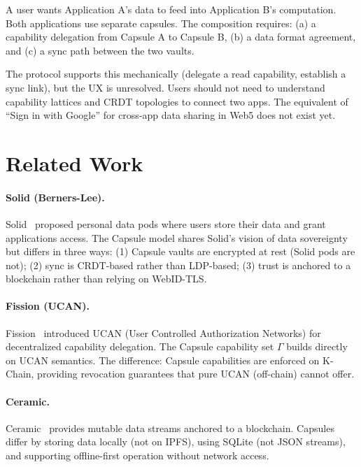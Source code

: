 \documentclass[11pt,a4paper]{article}
\begin{document}
A user wants Application A's data to feed into Application B's computation.
Both applications use separate capsules. The composition requires: (a) a
capability delegation from Capsule A to Capsule B, (b) a data format
agreement, and (c) a sync path between the two vaults.

The protocol supports this mechanically (delegate a read capability, establish
a sync link), but the UX is unresolved. Users should not need to understand
capability lattices and CRDT topologies to connect two apps. The equivalent
of ``Sign in with Google'' for cross-app data sharing in Web5 does not
exist yet.

\section{Related Work}\label{sec:related}

\paragraph{Solid (Berners-Lee).}
Solid~\cite{solid2016} proposed personal data pods where users store their data
and grant applications access. The Capsule model shares Solid's vision of data
sovereignty but differs in three ways: (1) Capsule vaults are encrypted at rest
(Solid pods are not); (2) sync is CRDT-based rather than LDP-based; (3) trust
is anchored to a blockchain rather than relying on WebID-TLS.

\paragraph{Fission (UCAN).}
Fission~\cite{fission2021} introduced UCAN (User Controlled Authorization
Networks) for decentralized capability delegation. The Capsule capability set
$\Gamma$ builds directly on UCAN semantics. The difference: Capsule capabilities
are enforced on K-Chain, providing revocation guarantees that pure UCAN
(off-chain) cannot offer.

\paragraph{Ceramic.}
Ceramic~\cite{ceramic2020} provides mutable data streams anchored to a
blockchain. Capsules differ by storing data locally (not on IPFS), using
SQLite (not JSON streams), and supporting offline-first operation without
network access.
\end{document}
